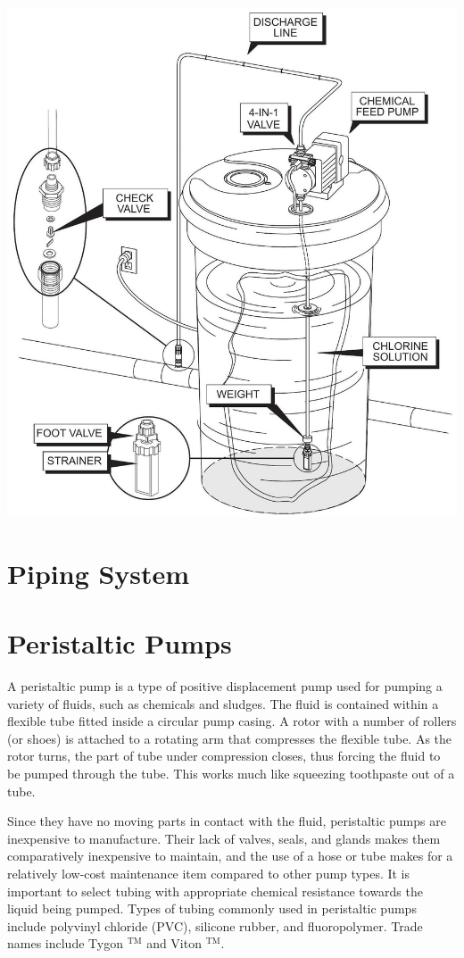 \documentclass[10pt]{article}
\begin{document}
\includegraphics[max width=\textwidth]{2022_11_03_65aa625ded296bdfd01fg-14}

\section{Piping System}
\section{Peristaltic Pumps}
A peristaltic pump is a type of positive displacement pump used for pumping a variety of fluids, such as chemicals and sludges. The fluid is contained within a flexible tube fitted inside a circular pump casing. A rotor with a number of rollers (or shoes) is attached to a rotating arm that compresses the flexible tube. As the rotor turns, the part of tube under compression closes, thus forcing the fluid to be pumped through the tube. This works much like squeezing toothpaste out of a tube.

Since they have no moving parts in contact with the fluid, peristaltic pumps are inexpensive to manufacture. Their lack of valves, seals, and glands makes them comparatively inexpensive to maintain, and the use of a hose or tube makes for a relatively low-cost maintenance item compared to other pump types. It is important to select tubing with appropriate chemical resistance towards the liquid being pumped. Types of tubing commonly used in peristaltic pumps include polyvinyl chloride (PVC), silicone rubber, and fluoropolymer. Trade names include Tygon ${ }^{\mathrm{TM}}$ and Viton ${ }^{\mathrm{TM}}$.
\end{document}
